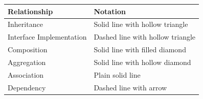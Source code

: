 \begin{center}
\begin{tabular}{l l}
\hline
\rowcolor{tableheader} \textbf{Relationship} & \textbf{Notation} \\
\hline
Inheritance & Solid line with hollow triangle \\
Interface Implementation & Dashed line with hollow triangle \\
Composition & Solid line with filled diamond \\
Aggregation & Solid line with hollow diamond \\
Association & Plain solid line \\
Dependency & Dashed line with arrow \\
\hline
\end{tabular}
\end{center}
